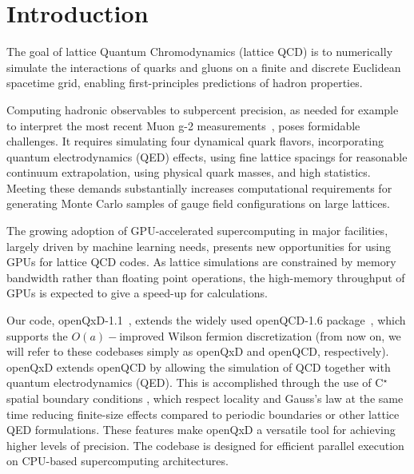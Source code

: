 \chapter{Introduction}
\label{ch:p1:introduction}

The goal of lattice Quantum Chromodynamics (lattice QCD) is to numerically simulate the interactions of quarks and gluons on a finite and discrete Euclidean spacetime grid, enabling first-principles predictions of hadron properties. 

Computing hadronic observables to subpercent precision, as needed for example to interpret the most recent Muon g-2 measurements~\cite{Muong-2:2023cdq,Gerardin:2020gpp}, poses formidable challenges. It requires simulating four dynamical quark flavors, incorporating quantum electrodynamics (QED) effects, using fine lattice spacings for reasonable continuum extrapolation, using physical quark masses, and high statistics. Meeting these demands substantially increases computational requirements for generating Monte Carlo samples of gauge field configurations on large lattices.

The growing adoption of GPU-accelerated supercomputing in major facilities, largely driven by machine learning needs, presents new opportunities for using GPUs for lattice QCD codes. As lattice simulations are constrained by memory bandwidth rather than floating point operations, the high-memory throughput of GPUs is expected to give a speed-up for calculations.

Our code, openQxD-1.1~\cite{openqxd}, extends the widely used openQCD-1.6 package~\cite{openqcd}, which supports the $O(a)-$improved Wilson fermion discretization (from now on, we will refer to these codebases simply as openQxD and openQCD, respectively). openQxD extends openQCD by allowing the simulation of QCD together with quantum electrodynamics (QED). This is accomplished through the use of C$^\star$ spatial boundary conditions \cite{Kronfeld1991}, which respect locality and Gauss's law at the same time reducing finite-size effects compared to periodic boundaries or other lattice QED formulations. These features make openQxD a versatile tool for achieving higher levels of precision. The codebase is designed for efficient parallel execution on CPU-based supercomputing architectures.

